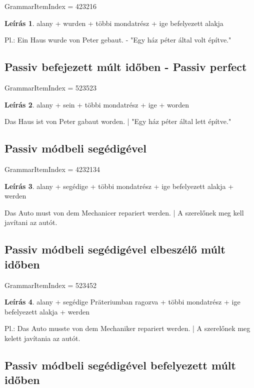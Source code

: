 \documentclass{article}
\theoremstyle{definition}
\newtheorem*{desc}{Leírás}
\begin{document}
GrammarItemIndex = 423216

\begin{desc}
alany + wurden + többi mondatrész + ige befelyezett alakja

Pl.: Ein Haus wurde von Peter gebaut. - "Egy ház péter által volt építve."
\end{desc}

\subsection{Passiv befejezett múlt időben - Passiv perfect}

GrammarItemIndex = 523523

\begin{desc}
alany + sein + többi mondatrész + ige + worden

Das Haus ist von Peter gabaut worden. | "Egy ház péter által lett építve."
\end{desc}

\subsection{Passiv módbeli segédigével}

GrammarItemIndex = 4232134

\begin{desc}
alany + segédige + többi mondatrész + ige befelyezett alakja + werden

Das Auto must von dem Mechanicer repariert werden. | A szerelőnek meg kell javítani az autót.
\end{desc}

\subsection{Passiv módbeli segédigével elbeszélő múlt időben}

GrammarItemIndex = 523452

\begin{desc}
alany + segédige Präteriumban ragozva + többi mondatrész + ige befelyezett alakja + werden

Pl.: Das Auto musste von dem Mechaniker repariert werden. | A szerelőnek meg kelett javítania az autót.
\end{desc}

\subsection{Passiv módbeli segédigével befelyezett múlt időben}
\end{document}
